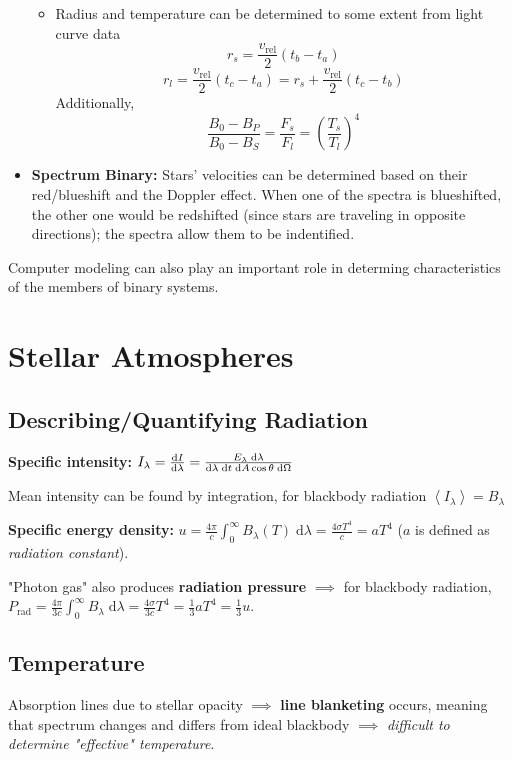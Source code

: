 \documentclass[12pt]{article}
\renewcommand{\dd}{\mathrm{d}}
\begin{document}
\begin{itemize}
\begin{itemize}
        \item Radius and temperature can be determined to some extent from light curve data
        $$r_s = \frac{v_{\text{rel}}}{2}(t_b - t_a)$$ $$r_l = \frac{v_{\text{rel}}}{2}(t_c - t_a) = r_s + \frac{v_{\text{rel}}}{2}(t_c - t_b)$$
        Additionally, $$\frac{B_0 - B_P}{B_0 - B_S} = \frac{F_s}{F_l} = \left(\frac{T_s}{T_l}\right)^4$$
    \end{itemize}
    \item \textbf{Spectrum Binary:} Stars' velocities can be determined based on their red/blueshift and the Doppler effect. When one of the spectra is blueshifted, the other one would be redshifted (since stars are traveling in opposite directions); the spectra allow them to be indentified.
\end{itemize}

Computer modeling can also play an important role in determing characteristics of the members of binary systems.

\section{Stellar Atmospheres}

\subsection{Describing/Quantifying Radiation}

\textbf{Specific intensity:} $I_{\lambda} = \dv{I}{\lambda} = \frac{E_{\lambda}\;\dd \lambda}{\dd \lambda\;\dd t\;\dd A\cos\theta\;\dd \Omega}$

Mean intensity can be found by integration, for blackbody radiation $\left<I_{\lambda}\right> = B_{\lambda}$

\textbf{Specific energy density:} $u = \frac{4\pi}{c}\int_{0}^{\infty}B_{\lambda}(T)\;\dd \lambda = \frac{4\sigma T^4}{c} = aT^4$ ($a$ is defined as \textit{radiation constant}).

"Photon gas" also produces \textbf{radiation pressure} $\implies$ for blackbody radiation, $P_{\text{rad}} = \frac{4\pi}{3c}\int_{0}^{\infty}B_{\lambda}\;\dd \lambda = \frac{4\sigma}{3c}T^4 = \frac{1}{3}aT^4 = \frac{1}{3}u$.

\subsection{Temperature}

Absorption lines due to stellar opacity $\implies$ \textbf{line blanketing} occurs, meaning that spectrum changes and differs from ideal blackbody $\implies$ \textit{difficult to determine "effective" temperature}.
\end{document}
